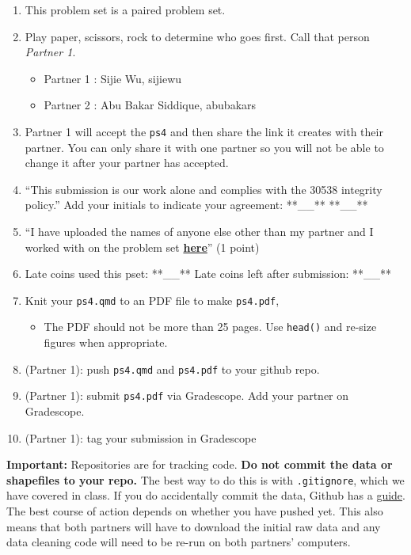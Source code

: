 \documentclass[
  letterpaper,
  DIV=11,
  numbers=noendperiod]{scrartcl}
\providecommand{\tightlist}{%
  \setlength{\itemsep}{0pt}\setlength{\parskip}{0pt}}\usepackage{longtable,booktabs,array}
\begin{document}
\begin{enumerate}
\def\labelenumi{\arabic{enumi}.}
\tightlist
\item
  This problem set is a paired problem set.
\item
  Play paper, scissors, rock to determine who goes first. Call that
  person \emph{Partner 1}.

  \begin{itemize}
  \tightlist
  \item
    Partner 1 : Sijie Wu, sijiewu
  \item
    Partner 2 : Abu Bakar Siddique, abubakars
  \end{itemize}
\item
  Partner 1 will accept the \texttt{ps4} and then share the link it
  creates with their partner. You can only share it with one partner so
  you will not be able to change it after your partner has accepted.
\item
  ``This submission is our work alone and complies with the 30538
  integrity policy.'' Add your initials to indicate your agreement:
  **\_\_** **\_\_**
\item
  ``I have uploaded the names of anyone else other than my partner and I
  worked with on the problem set
  \textbf{\href{https://docs.google.com/forms/d/185usrCREQaUbvAXpWhChkjghdGgmAZXA3lPWpXLLsts/edit}{here}}''
  (1 point)
\item
  Late coins used this pset: **\_\_** Late coins left after submission:
  **\_\_**
\item
  Knit your \texttt{ps4.qmd} to an PDF file to make \texttt{ps4.pdf},

  \begin{itemize}
  \tightlist
  \item
    The PDF should not be more than 25 pages. Use \texttt{head()} and
    re-size figures when appropriate.
  \end{itemize}
\item
  (Partner 1): push \texttt{ps4.qmd} and \texttt{ps4.pdf} to your github
  repo.
\item
  (Partner 1): submit \texttt{ps4.pdf} via Gradescope. Add your partner
  on Gradescope.
\item
  (Partner 1): tag your submission in Gradescope
\end{enumerate}

\textbf{Important:} Repositories are for tracking code. \textbf{Do not
commit the data or shapefiles to your repo.} The best way to do this is
with \texttt{.gitignore}, which we have covered in class. If you do
accidentally commit the data, Github has a
\href{https://docs.github.com/en/repositories/working-with-files/managing-large-files/about-large-files-on-github\#removing-files-from-a-repositorys-history}{guide}.
The best course of action depends on whether you have pushed yet. This
also means that both partners will have to download the initial raw data
and any data cleaning code will need to be re-run on both partners'
computers.
\end{document}
